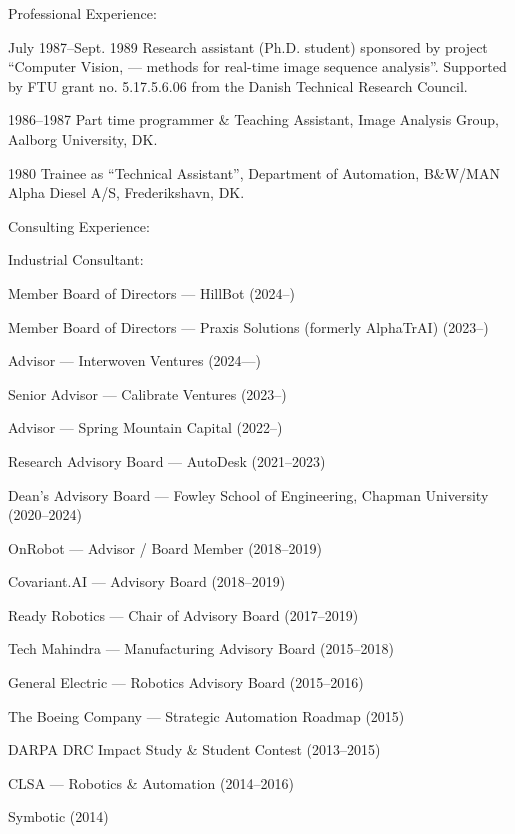 \documentclass{article}
\newenvironment{sublist}{%
  \begin{list}{}{%
      \setlength{\itemsep}{0em}\setlength{\parsep}{0em}%
      \setlength{\topsep}{0em}\setlength{\parskip}{0em}%
    }%
}%
{ \end{list} }
\begin{document}
\begin{cv}
\begin{cvlist}{Professional Experience:}
		\item[July 1987--Sept. 1989] Research assistant (Ph.D. student) sponsored
		by project ``Computer Vision, --- methods for real-time image
		sequence analysis''. Supported by FTU grant no. 5.17.5.6.06 from the
		Danish Technical Research Council.

		\item[1986--1987] Part time programmer \& Teaching Assistant,
		Image Analysis Group, Aalborg University, DK.\@

		\item[1980] Trainee as ``Technical Assistant'', Department of
		Automation, B\&W/MAN Alpha Diesel A/S, Frederikshavn, DK.\@
	\end{cvlist}

	\begin{cvlist}{Consulting Experience:}
		\item Industrial Consultant:
		\begin{sublist}
			\item Member Board of Directors --- HillBot (2024--)
			\item Member Board of Directors --- Praxis Solutions (formerly AlphaTrAI) (2023--)
			\item Advisor --- Interwoven Ventures (2024---)
			\item Senior Advisor --- Calibrate Ventures (2023--)
			\item Advisor --- Spring Mountain Capital (2022--)
			\item Research Advisory Board --- AutoDesk (2021--2023)
			\item Dean's Advisory Board --- Fowley School of Engineering, Chapman University (2020--2024)
			\item OnRobot --- Advisor / Board Member (2018--2019)
			\item Covariant.AI --- Advisory Board (2018--2019)
			\item Ready Robotics --- Chair of Advisory Board (2017--2019)
			\item Tech Mahindra --- Manufacturing Advisory Board (2015--2018)
			\item General Electric --- Robotics Advisory Board (2015--2016)
			\item The Boeing Company --- Strategic Automation Roadmap (2015)
			\item DARPA DRC Impact Study \& Student Contest (2013--2015)
			\item CLSA --- Robotics \& Automation (2014--2016)
			\item Symbotic (2014)

\end{sublist}
\end{cvlist}
\end{cv}
\end{document}
